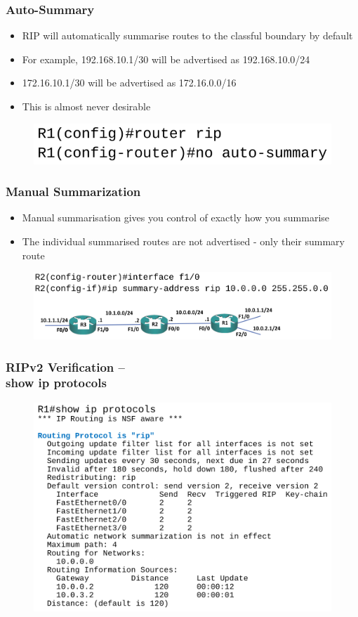 \documentclass[pdflatex,compress,mathserif]{beamer}
\begin{document}
\begin{frame}
	\frametitle{Auto-Summary}
	\begin{itemize}
		\item RIP will automatically summarise routes to the classful boundary by
default
		\item For example, 192.168.10.1/30 will be advertised as 192.168.10.0/24
		\item 172.16.10.1/30 will be advertised as 172.16.0.0/16
		\item This is almost never desirable
	\end{itemize}
	\begin{figure}
		\centering
		\includegraphics[width=0.7\linewidth]{img/img02}
	\end{figure}
\end{frame}

\begin{frame}
	\frametitle{Manual Summarization}
	\begin{itemize}
		\item Manual summarisation gives you control of exactly how you summarise
		\item The individual summarised routes are not advertised - only their summary
route
	\end{itemize}
	\begin{figure}
		\centering
		\includegraphics[width=\linewidth]{img/img03}
	\end{figure}
\end{frame}

\begin{frame}
	\frametitle{RIPv2 Verification – \\show ip protocols}
	\begin{figure}
		\centering
		\includegraphics[width=0.8\linewidth]{img/img04}
	\end{figure}
\end{frame}
\end{document}
